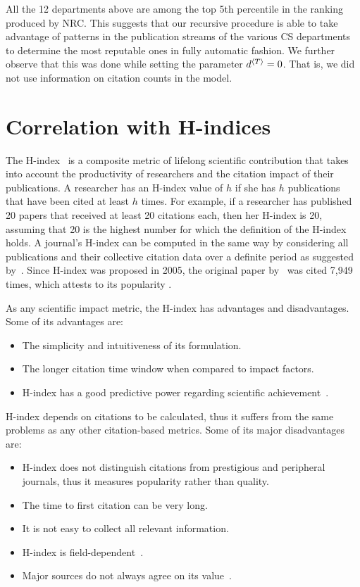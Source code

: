 \documentclass[man,floatsintext]{apa6}
\let\footnote\endnote
\let \citeA \textcite
\let \cite \parencite
\begin{document}
All the 12 departments above are among the top 5th percentile in the ranking produced by NRC. 
This suggests that our recursive procedure is able to take advantage of patterns in the publication 
streams of the various CS departments to determine the most reputable ones in fully automatic fashion.
We further observe that this was done while setting the parameter $d{^{\langle T \rangle}} = 0$. That is, we did 
not use information on citation counts in the model. 

\section{Correlation with H-indices} 
\label{sec:correlation}

The H-index~\cite{Hirsch2005} is a composite metric of lifelong scientific contribution that takes 
into account the productivity of researchers and the citation impact of their publications.
A researcher has an H-index value of $ h $ if she has $ h $ publications that have been cited at 
least $ h $ times. For example, if a researcher has published 20 papers that received at least 20 
citations each, then her H-index is 20, assuming that 20 is the highest number for which the 
definition of the H-index holds. A journal's H-index can be computed 
in the same way by considering all publications and their collective citation data over a 
definite period as suggested by~\citeA{Braun2006}.
Since H-index was proposed in 2005, the original paper by~\citeA{Hirsch2005} was 
cited 7,949 times, which attests to its popularity 
\footnote{According to Google Scholar, up to the end of 2017.}.

As any scientific impact metric, the H-index has advantages and disadvantages. 
Some of its advantages are:

\begin{itemize}
\item The simplicity and intuitiveness of its formulation.
\item The longer citation time window when compared to impact factors.
\item H-index has a good predictive power regarding scientific achievement~\cite{Bornmann2005, Hirsch2007}.
\end{itemize}

H-index depends on citations to be calculated, thus it suffers from the 
same problems as any other citation-based metrics. Some of its major disadvantages are:

\begin{itemize}
\item H-index does not distinguish citations from prestigious and peripheral journals, thus 
it measures popularity rather than quality.
\item The time to first citation can be very long.
\item It is not easy to collect all relevant information.
\item H-index is field-dependent~\cite{Wendl2007}.
\item Major sources do not always agree on its value~\cite{Bar-Ilan2008}. 
\end{itemize}
\end{document}
